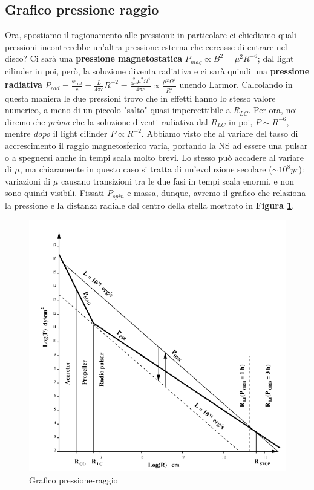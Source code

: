 \subsection{Grafico pressione raggio}
Ora, spostiamo il ragionamento alle pressioni: in particolare ci chiediamo quali pressioni incontrerebbe un'altra pressione esterna che cercasse di entrare nel disco?
Ci sarà una \textbf{pressione magnetostatica} $P_{mag}\propto B^2 = \mu^2R^{-6}$; dal light cilinder in poi, però, la soluzione diventa radiativa e ci sarà quindi una \textbf{pressione radiativa} $P_{rad} = \frac{\phi_{rad}}{c} = \frac{L}{4\pi c}R^{-2} = \frac{\frac{2}{3c^3}\mu^2\Omega^4}{4\pi c} \propto \frac{\mu^2\Omega^4}{R^2} $ unendo Larmor.
Calcolando in questa maniera le due pressioni trovo che in effetti hanno lo stesso valore numerico, a meno di un piccolo "salto" quasi impercettibile a $R_{LC}$.
Per ora, noi diremo che \textit{prima} che la soluzione diventi radiativa dal $R_{LC}$ in poi, $P\sim R^{-6}$, mentre \textit{dopo} il light cilinder $P\propto R^{-2}$.
Abbiamo visto che al variare del tasso di accrescimento il raggio magnetosferico varia, portando la NS ad essere una pulsar o a spegnersi anche in tempi scala molto brevi.
Lo stesso può accadere al variare di $\mu$, ma chiaramente in questo caso si tratta di un'evoluzione secolare ($\sim 10^{8}yr $): variazioni di $\mu$ causano transizioni tra le due fasi in tempi scala enormi, e non sono quindi visibili.
Fissati $P_{spin}$ e massa, dunque, avremo il grafico che relaziona la pressione e la distanza radiale dal centro della stella mostrato in \textbf{Figura \ref{fig: grafico pressione raggio}}.
\begin{figure}[ht!]
    \centering
    \includegraphics[width=0.6\linewidth]{Immagini/Grafico_pressione_raggio.png}
    \caption{Grafico pressione-raggio}
    \label{fig: grafico pressione raggio}
\end{figure}
